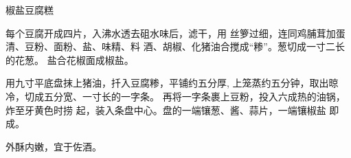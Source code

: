 \begin{recipe}{椒盐豆腐糕}

\ingredients


\cooking

\step 每个豆腐开成四片，入沸水透去砠水味后，滤干，用 丝箩过细，连同鸡脯茸加蛋清、豆粉、面粉、盐、味精、料 酒、胡椒、化猪油合搅成“糁”。葱切成一寸二长的花葱。 盐合花椒面成椒盐。

\step 用九寸平底盘抹上猪油，扦入豆腐糁，平铺约五分厚, 上笼蒸约五分钟，取出晾冷，切成五分宽、一寸长的一字条。 再将一字条裹上豆粉，投入六成热的油锅，炸至牙黄色时捞 起，装入条盘中心。盘的一端镶葱、酱、蒜片，一端镶椒盐 即成。

\notes

外酥内嫩，宜于佐酒。

\end{recipe}

